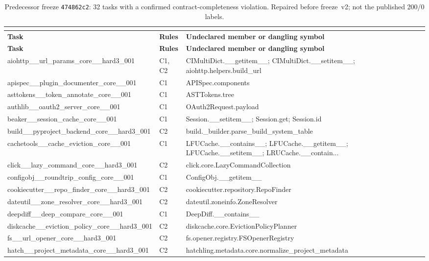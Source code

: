 \begin{longtable}{llp{}}
\caption{Predecessor freeze \texttt{474862c2}: 32 tasks with a confirmed contract-completeness violation. Repaired before freeze~v2; not the published 200/0 labels.} \\
\label{tab:violators} \\
\toprule
\textbf{Task} & \textbf{Rules} & \textbf{Undeclared member or dangling symbol} \\
\midrule
\endfirsthead
\toprule
\textbf{Task} & \textbf{Rules} & \textbf{Undeclared member or dangling symbol} \\
\midrule
\endhead
aiohttp\_\_url\_params\_core\_\_hard3\_001 & C1, C2 & CIMultiDict.\_\_getitem\_\_; CIMultiDict.\_\_setitem\_\_; aiohttp.helpers.build\_url \\
apispec\_\_plugin\_documenter\_core\_\_001 & C1 & APISpec.components \\
asttokens\_\_token\_annotate\_core\_\_001 & C1 & ASTTokens.tree \\
authlib\_\_oauth2\_server\_core\_\_001 & C1 & OAuth2Request.payload \\
beaker\_\_session\_cache\_core\_\_001 & C1 & Session.\_\_setitem\_\_; Session.get; Session.id \\
build\_\_pyproject\_backend\_core\_\_hard3\_001 & C2 & build.\_builder.parse\_build\_system\_table \\
cachetools\_\_cache\_eviction\_core\_\_001 & C1 & LFUCache.\_\_contains\_\_; LFUCache.\_\_getitem\_\_; LFUCache.\_\_setitem\_\_; LRUCache.\_\_contain... \\
click\_\_lazy\_command\_core\_\_hard3\_001 & C2 & click.core.LazyCommandCollection \\
configobj\_\_roundtrip\_config\_core\_\_001 & C1 & ConfigObj.\_\_getitem\_\_ \\
cookiecutter\_\_repo\_finder\_core\_\_hard3\_001 & C2 & cookiecutter.repository.RepoFinder \\
dateutil\_\_zone\_resolver\_core\_\_hard3\_001 & C2 & dateutil.zoneinfo.ZoneResolver \\
deepdiff\_\_deep\_compare\_core\_\_001 & C1 & DeepDiff.\_\_contains\_\_ \\
diskcache\_\_eviction\_policy\_core\_\_hard3\_001 & C2 & diskcache.core.EvictionPolicyPlanner \\
fs\_\_url\_opener\_core\_\_hard3\_001 & C2 & fs.opener.registry.FSOpenerRegistry \\
hatch\_\_project\_metadata\_core\_\_hard3\_001 & C2 & hatchling.metadata.core.normalize\_project\_metadata \\

\end{longtable}

